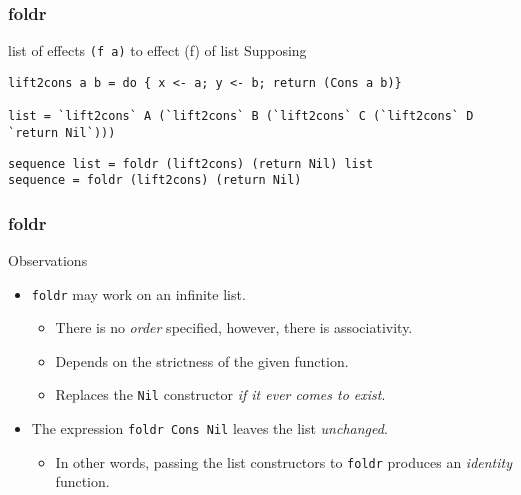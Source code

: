 \begin{frame}[fragile]
\frametitle{foldr}
\begin{block}{list of effects \lstinline{(f a)} to effect (f) of list}
Supposing
\begin{lstlisting}[style=haskell,basicstyle=\tiny\ttfamily,mathescape]
lift2cons a b = do { x <- a; y <- b; return (Cons a b)}

list = `lift2cons` A (`lift2cons` B (`lift2cons` C (`lift2cons` D `return Nil`)))
\end{lstlisting}
\end{block}
\begin{lstlisting}[style=haskell,basicstyle=\scriptsize\ttfamily,mathescape]
sequence list = foldr (lift2cons) (return Nil) list
sequence = foldr (lift2cons) (return Nil)
\end{lstlisting}
\end{frame}

\begin{frame}[fragile]
\frametitle{foldr}
\begin{block}{Observations}
\begin{itemize}
\item<1-> \lstinline[basicstyle=\ttfamily]$foldr$ may work on an infinite list.
  \begin{itemize}
  \item There is no \emph{order} specified, however, there is associativity.
  \item Depends on the strictness of the given function.
  \item Replaces the \lstinline[basicstyle=\ttfamily]$Nil$ constructor \emph{if it ever comes to exist}.
  \end{itemize}
\item<2-> The expression \lstinline[basicstyle=\ttfamily]$foldr Cons Nil$ leaves the list \emph{unchanged}.
  \begin{itemize}
  \item In other words, passing the list constructors to \lstinline[basicstyle=\ttfamily]$foldr$ produces an \emph{identity} function.
  \end{itemize}
\end{itemize}
\end{block}
\end{frame}

